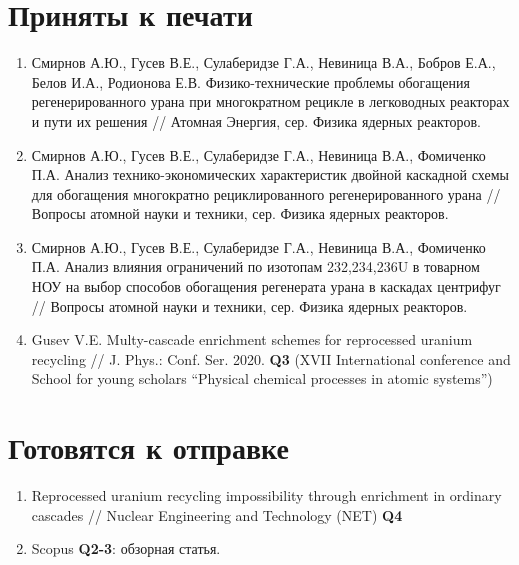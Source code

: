 \section{Приняты к печати}
\begin{enumerate}
    \item Смирнов А.Ю., Гусев В.Е., Сулаберидзе Г.А., Невиница В.А., Бобров Е.А., Белов И.А., Родионова Е.В. Физико-технические проблемы обогащения регенерированного
    урана при многократном рецикле в легководных реакторах и пути их решения // Атомная Энергия, сер. Физика ядерных реакторов.
    \item Смирнов А.Ю., Гусев В.Е., Сулаберидзе Г.А., Невиница В.А., Фомиченко П.А. Анализ технико-экономических характеристик двойной каскадной схемы для обогащения многократно рециклированного регенерированного урана //  Вопросы атомной науки и техники, сер. Физика ядерных реакторов.
    \item Смирнов А.Ю., Гусев В.Е., Сулаберидзе Г.А., Невиница В.А., Фомиченко П.А. Анализ влияния ограничений по изотопам 232,234,236U в товарном НОУ на выбор способов обогащения регенерата урана в каскадах центрифуг //  Вопросы атомной науки и техники, сер. Физика ядерных реакторов.
    \item Gusev V.E. Multy-cascade enrichment schemes for reprocessed uranium recycling // J. Phys.: Conf. Ser. 2020. \textbf{Q3} (XVII International conference and School for young scholars “Physical chemical processes in atomic systems”)
\end{enumerate}

\section{Готовятся к отправке}
\begin{enumerate}
    \item Reprocessed uranium recycling impossibility through enrichment in ordinary cascades // Nuclear Engineering and Technology (NET) \textbf{Q4}
    \item Scopus \textbf{Q2-3}: обзорная статья.
\end{enumerate}

